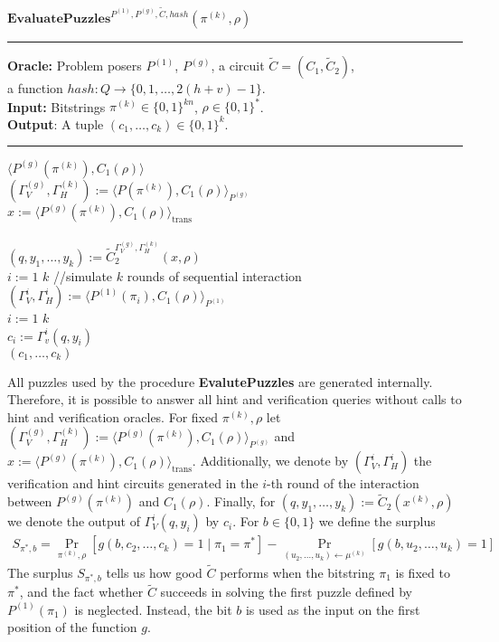 \begin{codeblock}
  $\textbf{EvaluatePuzzles}^{P^{(1)}, P^{(g)}, \widetilde{C}, hash}(\pi^{(k)}, \rho)$
  \medskip \hrule \medskip
  \textbf{Oracle:}  Problem posers $P^{(1)}$, $P^{(g)}$, a circuit $\widetilde{C} = (C_1, \widetilde{C}_2)$,\\
  \IndII a function $hash : Q \rightarrow \{0,1,\dots, 2(h+v)-1\}$.\\
  \textbf{Input:} Bitstrings $\pi^{(k)} \in \{0,1\}^{kn}$, $\rho \in \{0,1\}^{*}$.\\
  \textbf{Output}: A tuple $(c_1, \dots, c_k) \in \{0,1\}^{k}$.
  \medskip\hrule\medskip
  \Run $\langle P^{(g)}(\pi^{(k)}), C_1(\rho) \rangle$ \\
  \IndI $(\Gamma_V^{(g)}, \Gamma_H^{(k)}) := \langle P(\pi^{(k)}), C_1(\rho) \rangle_{P^{(g)}}$ \\
  \IndI $x := \langle P^{(g)}(\pi^{(k)}), C_1(\rho) \rangle_{\text{trans}}$ \\ \\
  $(q, y_1, \dots, y_k) := \widetilde{C}_2^{\Gamma_V^{(g)}, \Gamma_H^{(k)}} (x, \rho)$ \\
  \For $i:=1$ \To $k$ \Do \IndII //simulate $k$ rounds of sequential interaction \\
  \IndI $(\Gamma_V^{i}, \Gamma_H^{i}) := \langle P^{(1)}(\pi_i), C_1(\rho) \rangle_{P^{(1)}} $\\
  \For $i:=1$ \To $k$ \Do \\
  \IndI $c_i := \Gamma_v^{i}(q, y_i)$\\
  \return $(c_1, \dots, c_k)$
\end{codeblock}
%
All puzzles used by the procedure \textbf{EvalutePuzzles} are generated internally.
Therefore, it is possible to answer all hint and verification queries without calls to hint and verification oracles.
For fixed $\pi^{(k)}, \rho$ let $(\Gamma_V^{(g)}, \Gamma_H^{(k)}) := \langle P^{(g)}(\pi^{(k)}), C_1(\rho) \rangle_{P^{(g)}}$
and $x := \langle P^{(g)}(\pi^{(k)}), C_1(\rho) \rangle_{\text{trans}}$.
Additionally, we denote by $(\Gamma_V^{i}, \Gamma_H^{i})$ the verification and hint circuits generated in the $i$-th
round of the interaction between $P^{(g)}(\pi^{(k)})$ and $C_1(\rho)$.
Finally, for $(q,y_1, \dots, y_k) := \widetilde{C}_2(x^{(k)}, \rho)$ we denote the output of $\Gamma_V^i(q,y_i)$ by $c_i$.
For $b \in \{0,1\}$ we define the surplus
\begin{align}
  \label{eq:s_pi_b}
S_{\pi^*, b} = \underset{\pi^{(k)}, \rho}{\Pr}\left[g(b, c_2, \dots, c_k) = 1 \mid \pi_1 = \pi^*\right] - \underset{(u_2, \dots, u_k) \leftarrow \mu^{(k)}}{\Pr}\left[g(b, u_2, \dots, u_k) = 1\right]
\end{align}
%
The surplus $S_{\pi^*, b}$ tells us how good $\widetilde{C}$ performs when the bitstring $\pi_1$ is fixed to $\pi^*$,
and the fact whether $\widetilde{C}$ succeeds in solving the first puzzle defined by $P^{(1)}(\pi_1)$ is neglected.
Instead, the bit $b$ is used as the input on the first position of the function $g$.

